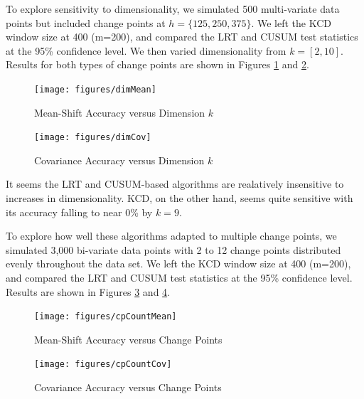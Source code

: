 \documentclass[conference,letterpaper]{IEEEtran}
\begin{document}
To explore sensitivity to dimensionality, we simulated 500 multi-variate data points but included change points at $h=\{125, 250, 375\}$. 
We left the KCD window size at 400 (m=200), and compared the LRT and CUSUM test statistics at the 95\% confidence level. We then varied dimensionality from $k=[2, 10]$.
Results for both types of change points are shown in Figures \ref{fig:dimensionMean} and \ref{fig:dimensionCov}.

\begin{figure}[htbp]
\begin{center}
\texttt{[image: figures/dimMean]}
\caption{Mean-Shift Accuracy versus Dimension $k$}
\label{fig:dimensionMean}
\end{center}
\end{figure}

\begin{figure}[htbp]
\begin{center}
\texttt{[image: figures/dimCov]}
\caption{Covariance Accuracy versus Dimension $k$}
\label{fig:dimensionCov}
\end{center}
\end{figure}

It seems the LRT and CUSUM-based algorithms are realatively insensitive to increases in dimensionality. KCD, on the other hand, seems quite sensitive with its accuracy falling to near 0\% by $k=9$.

To explore how well these algorithms adapted to multiple change points, we simulated 3,000 bi-variate data points with 2 to 12 change points distributed evenly throughout the data set. 
We left the KCD window size at 400 (m=200), and compared the LRT and CUSUM test statistics at the 95\% confidence level.
Results are shown in Figures \ref{fig:cpMean} and \ref{fig:cpCov}.

\begin{figure}[htbp]
\begin{center}
\texttt{[image: figures/cpCountMean]}
\caption{Mean-Shift Accuracy versus Change Points}
\label{fig:cpMean}
\end{center}
\end{figure}

\begin{figure}[htbp]
\begin{center}
\texttt{[image: figures/cpCountCov]}
\caption{Covariance Accuracy versus Change Points}
\label{fig:cpCov}
\end{center}
\end{figure}
\end{document}
